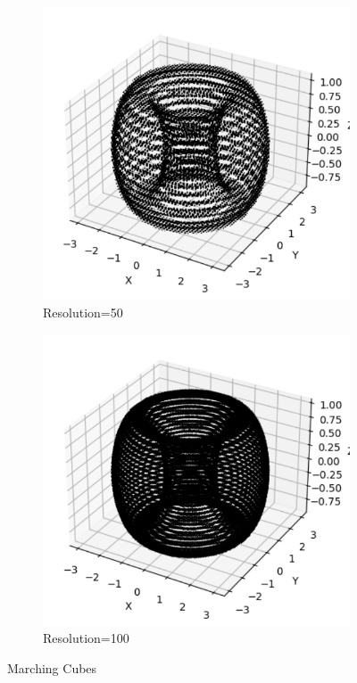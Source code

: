 \documentclass[10pt,a4paper]{article}
\begin{document}
\begin{figure}[H]
\centering
\begin{subfigure}[b]{0.30\textwidth}
    \centering
    \includegraphics[width=\textwidth]{VisualComputingReportResults/MarchingCubesResolution50}
    \caption{\small Resolution=50}
    \label{fig:cubic}
\end{subfigure}
\hspace{0.1\textwidth}
\begin{subfigure}[b]{0.30\textwidth}
    \centering
    \includegraphics[width=\textwidth]{VisualComputingReportResults/MarchingCubesResolution100}
    \caption{\small Resolution=100}
    \label{fig:quartic}
\end{subfigure}
\caption{\small Marching Cubes}
\label{fig:bezier_curves}
\end{figure}
\end{document}
